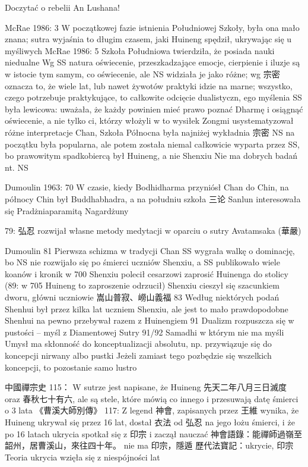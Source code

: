 Doczytać o rebelii An Lushana!

McRae 1986: 3
W początkowej fazie istnienia Południowej Szkoły, była ona mało znana; sutra wyjaśnia to długim czasem, jaki Huineng spędził, ukrywając się u myśliwych
McRae 1986: 5
Szkoła Południowa twierdziła, że posiada nauki niedualne
Wg SS natura oświecenie, przeszkadzające emocje, cierpienie i iluzje są w istocie tym samym, co oświecenie, ale NS widziała je jako różne; wg 宗密 oznacza to, że wiele lat, lub nawet żywotów praktyki idzie na marne; wszystko, czego potrzebuje praktykujące, to całkowite odcięcie dualistyczn, ego myślenia
SS była lewicowa: uważała, że każdy powinien mieć prawo poznać Dharmę i osiągnąć oświecenie, a nie tylko ci, którzy włożyli w to wysiłek
Zongmi usystematyzował różne interpretacje Chan, Szkoła Północna była najniżej
wykładnia 宗密 NS na początku była popularna, ale potem została niemal całkowicie wyparta przez SS, bo prawowitym spadkobiercą był Huineng, a nie Shenxiu
Nie ma dobrych badań nt. NS

Dumoulin 1963: 70
W czasie, kiedy Bodhidharma przyniósł Chan do Chin, na północy Chin był Buddhabhadra, a na południu szkoła 三论
Sanlun interesowała się Pradżniaparamitą Nagardżuny

79: 弘忍 rozwijał własne metody medytacji w oparciu o sutry Avatamsaka (華嚴)

Dumoulin 81
Pierwsza schizma w tradycji Chan
SS wygrała walkę o dominację, bo NS nie rozwijało się po śmierci uczniów Shenxiu, a SS publikowało wiele koanów i kronik
w 700 Shenxiu polecił cesarzowi zaprosić Huinenga do stolicy
(89: w 705 Huineng to zaproszenie odrzucił)
Shenxiu cieszył się szacunkiem dworu, główni uczniowie 嵩山普寂、嶗山義福
83
Według niektórych podań Shenhui był przez kilka lat uczniem Shenxiu, ale jest to mało prawdopodobne
Shenhui na pewno przebywał razem z Huinengiem
91 Dualizm rozpuszcza się w pustości -- myśl z Diamentowej Sutry
91/92 Samadhi w którym nie ma myśli
Umysł ma skłonność do konceptualizacji absolutu, np. przywiązuje się do koncepcji nirwany albo pustki
Jeżeli zamiast tego pozbędzie się wszelkich koncepcji, to pozostanie samo lustro


中國禪宗史 115：
W sutrze jest napisane, że Huineng 先天二年八月三日滅度 oraz 春秋七十有六, ale są stele, które mówią co innego i przesuwają datę śmierci o 3 lata
《曹溪大師別傳》
117: Z legend 神會, zapisanych przez 王維 wynika, że Huineng ukrywał się przez 16 lat, dostał 衣法 od 弘忍 na jego łożu śmierci, i że po 16 latach ukrycia spotkał się z 印宗 i zaczął nauczać
神會語錄：能禪師過嶺至韶州，居曹溪山，來往四十年。 nie ma 印宗，隱遁
歷代法寶記：ukrycie, 印宗
Teoria ukrycia wzięła się z niespójności lat

